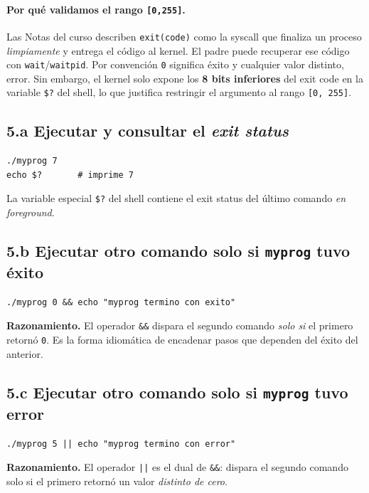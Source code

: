 \documentclass[11pt,a4paper]{article}
\begin{document}
\paragraph{Por qué validamos el rango \texttt{[0,255]}.}
Las Notas del curso describen \texttt{exit(code)} como la syscall que
finaliza un proceso \emph{limpiamente} y entrega el código al kernel.
El padre puede recuperar ese código con \texttt{wait}/\texttt{waitpid}.
Por convención \texttt{0} significa éxito y cualquier valor distinto,
error. Sin embargo, el kernel solo expone los \textbf{8 bits
inferiores} del exit code en la variable \texttt{\$?} del shell, lo
que justifica restringir el argumento al rango \texttt{[0, 255]}.

\subsection*{5.a Ejecutar y consultar el \emph{exit status}}

\begin{lstlisting}
./myprog 7
echo $?       # imprime 7
\end{lstlisting}

La variable especial \texttt{\$?} del shell contiene el exit status
del último comando \emph{en foreground}.

\subsection*{5.b Ejecutar otro comando solo si \texttt{myprog} tuvo éxito}

\begin{lstlisting}
./myprog 0 && echo "myprog termino con exito"
\end{lstlisting}

\textbf{Razonamiento.} El operador \texttt{\&\&} dispara el segundo
comando \emph{solo si} el primero retornó \texttt{0}. Es la forma
idiomática de encadenar pasos que dependen del éxito del anterior.

\subsection*{5.c Ejecutar otro comando solo si \texttt{myprog} tuvo error}

\begin{lstlisting}
./myprog 5 || echo "myprog termino con error"
\end{lstlisting}

\textbf{Razonamiento.} El operador \texttt{||} es el dual de
\texttt{\&\&}: dispara el segundo comando solo si el primero retornó
un valor \emph{distinto de cero}.
\end{document}

